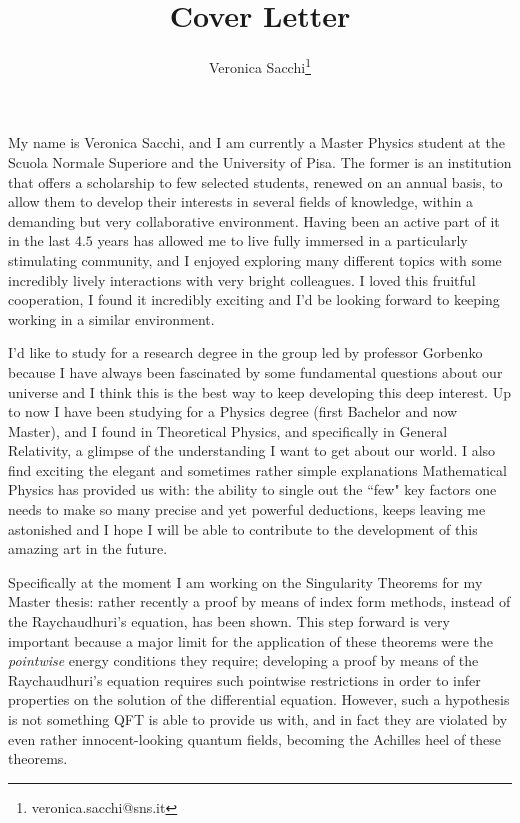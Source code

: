 \documentclass[12pt, a4paper]{article}
\title{Cover Letter}
\author{Veronica Sacchi\thanks{veronica.sacchi@sns.it}}
\begin{document}
\maketitle

My name is Veronica Sacchi, and I am currently a Master Physics student at the Scuola Normale Superiore and the University of Pisa. The former is an institution that offers a scholarship to few selected students, renewed on an annual basis, to allow them to develop their interests in several fields of knowledge, within a demanding but very collaborative environment.
Having been an active part of it in the last \(4.5\) years has allowed me to live fully immersed in a particularly stimulating community, and I enjoyed exploring many different topics with some incredibly lively interactions with very bright colleagues. I loved this fruitful cooperation, I found it incredibly exciting and I'd be looking forward to keeping working in a similar environment.

I'd like to study for a research degree in the group led by professor Gorbenko because I have always been fascinated by some fundamental questions about our universe and I think this is the best way to keep developing this deep interest.
Up to now I have been studying for a Physics degree (first Bachelor and now Master), and I found in Theoretical Physics, and specifically in General Relativity, a glimpse of the understanding I want to get about our world. 
I also find exciting the elegant and sometimes rather simple explanations Mathematical Physics has provided us with: the ability to single out the ``few" key factors one needs to make so many precise and yet powerful deductions, keeps leaving me astonished and I hope I will be able to contribute to the development of this amazing art in the future.

Specifically at the moment I am working on the Singularity Theorems for my Master thesis: rather recently a proof by means of index form methods, instead of the Raychaudhuri's equation, has been shown. This step forward is very important because a major limit for the application of these theorems were the \emph{pointwise} energy conditions they require; developing a proof by means of the Raychaudhuri's equation requires such pointwise restrictions in order to infer properties on the solution of the differential equation. However, such a hypothesis is not something QFT is able to provide us with, and in fact they are violated by even rather innocent-looking quantum fields, becoming the Achilles heel of these theorems.
\end{document}
